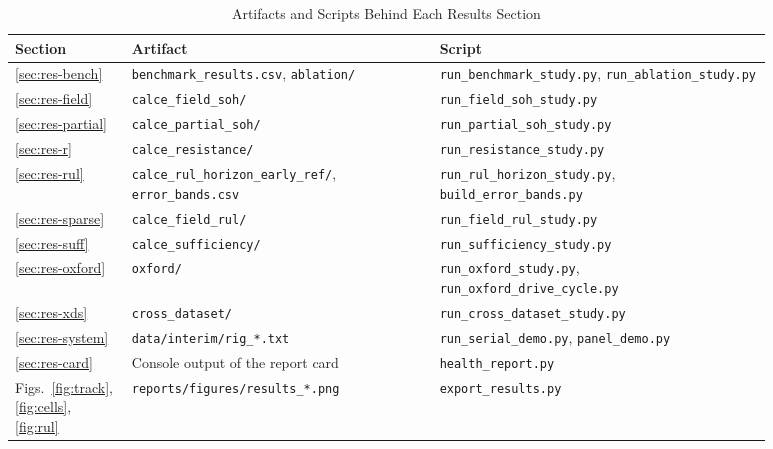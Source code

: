 \setcounter{table}{0}
\begin{table}[htbp]
	\caption{Artifacts and Scripts Behind Each Results Section}
	\centering
	\footnotesize
	\renewcommand{\arraystretch}{1.15}
	\setlength{\tabcolsep}{3pt}
	\begin{tabular}{|L{0.09\linewidth}|L{0.38\linewidth}|L{0.41\linewidth}|}
		\hline
		\textbf{Section} & \textbf{Artifact} & \textbf{Script} \\
		\hline
		\ref{sec:res-bench} & \texttt{benchmark\_results.csv}, \texttt{ablation/} & \texttt{run\_benchmark\_study.py}, \texttt{run\_ablation\_study.py} \\
		\hline
		\ref{sec:res-field} & \texttt{calce\_field\_soh/} & \texttt{run\_field\_soh\_study.py} \\
		\hline
		\ref{sec:res-partial} & \texttt{calce\_partial\_soh/} & \texttt{run\_partial\_soh\_study.py} \\
		\hline
		\ref{sec:res-r} & \texttt{calce\_resistance/} & \texttt{run\_resistance\_study.py} \\
		\hline
		\ref{sec:res-rul} & \texttt{calce\_rul\_horizon\_}\allowbreak\texttt{early\_ref/}, \texttt{error\_bands.csv} & \texttt{run\_rul\_horizon\_study.py}, \texttt{build\_error\_bands.py} \\
		\hline
		\ref{sec:res-sparse} & \texttt{calce\_field\_rul/} & \texttt{run\_field\_rul\_study.py} \\
		\hline
		\ref{sec:res-suff} & \texttt{calce\_sufficiency/} & \texttt{run\_sufficiency\_study.py} \\
		\hline
		\ref{sec:res-oxford} & \texttt{oxford/} & \texttt{run\_oxford\_study.py}, \texttt{run\_oxford\_drive\_cycle.py} \\
		\hline
		\ref{sec:res-xds} & \texttt{cross\_dataset/} & \texttt{run\_cross\_dataset\_study.py} \\
		\hline
		\ref{sec:res-system} & \texttt{data/interim/rig\_*.txt} & \texttt{run\_serial\_demo.py}, \texttt{panel\_demo.py} \\
		\hline
		\ref{sec:res-card} & Console output of the report card & \texttt{health\_report.py} \\
		\hline
		Figs.~\ref{fig:track}, \ref{fig:cells}, \ref{fig:rul} & \texttt{reports/figures/}\allowbreak\texttt{results\_*.png} & \texttt{export\_results.py} \\
		\hline
	\end{tabular}
	\label{tab:provenance}
\end{table}

